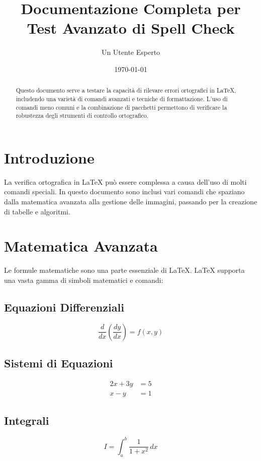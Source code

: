 \documentclass[12pt]{article}
\title{Documentazione Completa per Test Avanzato di Spell Check}
\author{Un Utente Esperto}
\date{\today}
\begin{document}
\maketitle

\begin{abstract}
Questo documento serve a testare la capacità di rilevare errori ortografici in LaTeX, includendo una varietà di comandi avanzati e tecniche di formattazione. L'uso di comandi meno comuni e la combinazione di pacchetti permettono di verificare la robustezza degli strumenti di controllo ortografico.
\end{abstract}

\tableofcontents
\newpage

\section{Introduzione}
La verifica ortografica in LaTeX può essere complessa a causa dell'uso di molti comandi speciali. In questo documento sono inclusi vari comandi che spaziano dalla matematica avanzata alla gestione delle immagini, passando per la creazione di tabelle e algoritmi.

\section{Matematica Avanzata}
Le formule matematiche sono una parte essenziale di LaTeX. LaTeX supporta una vasta gamma di simboli matematici e comandi:

\subsection{Equazioni Differenziali}
\begin{equation}
    \frac{d}{dx} \left( \frac{dy}{dx} \right) = f(x, y)
\end{equation}

\subsection{Sistemi di Equazioni}
\begin{align}
    2x + 3y &= 5 \\
    x - y &= 1
\end{align}

\subsection{Integrali}
\begin{equation}
    I = \int_{a}^{b} \frac{1}{1+x^2} \, dx
\end{equation}
\end{document}
